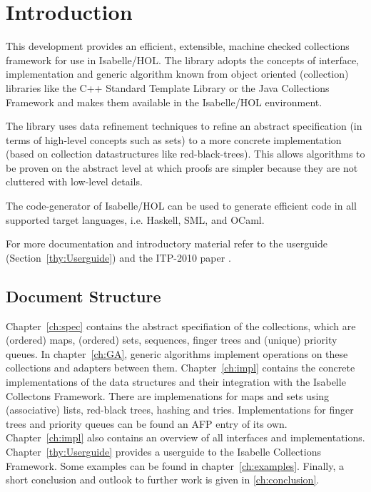 \chapter{Introduction}
  This development provides an efficient, extensible, machine checked collections framework for use
  in Isabelle/HOL. The library adopts the concepts of interface, implementation and generic algorithm
  known from object oriented (collection) libraries like the C++ Standard Template Library\cite{C++STL} or 
  the Java Collections Framework\cite{JavaCollFr} and makes them available in the Isabelle/HOL environment.

  The library uses data refinement techniques to refine an abstract specification (in terms of high-level concepts such as sets) to a more concrete implementation (based on collection datastructures like red-black-trees).
  This allows algorithms to be proven on the abstract level at which proofs are simpler because they are not cluttered with low-level details.

  The code-generator of Isabelle/HOL can be used to generate efficient code in all supported target languages, i.e. Haskell, SML, and OCaml.

  For more documentation and introductory material refer to the userguide (Section~\ref{thy:Userguide}) and the ITP-2010 paper \cite{LammichLochbihler2010ITP}.

\section{Document Structure}
  Chapter~\ref{ch:spec} contains the abstract specifiation of the collections, which are (ordered) maps, (ordered) sets, sequences, finger trees and (unique) priority queues.
  In chapter~\ref{ch:GA}, generic algorithms implement operations on these collections and adapters between them.
  Chapter~\ref{ch:impl} contains the concrete implementations of the data structures and their integration with the Isabelle Collectons Framework.
  There are implemenations for maps and sets using (associative) lists, red-black trees, hashing and tries.
  Implementations for finger trees and priority queues can be found an AFP entry of its own. Chapter~\ref{ch:impl} also contains an overview of all interfaces and
  implementations.
  Chapter~\ref{thy:Userguide} provides a userguide to the Isabelle Collections Framework.
  Some examples can be found in chapter~\ref{ch:examples}.
  Finally, a short conclusion and outlook to further work is given in \ref{ch:conclusion}.


